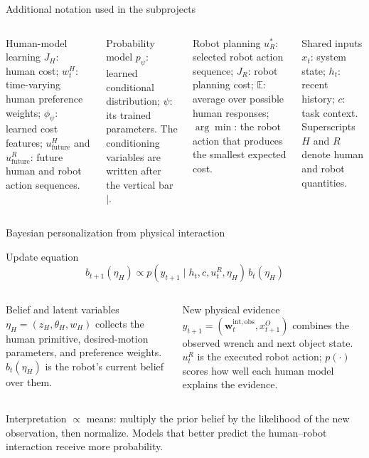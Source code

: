 \documentclass[aspectratio=169,11pt]{beamer}
\begin{document}
\begin{frame}{Additional notation used in the subprojects}
\begin{columns}[T,onlytextwidth]
\begin{block}{Human-model learning}
$J_H$: human cost; $w_t^H$: time-varying human preference weights; $\phi_\psi$: learned cost features; $u_{\mathrm{future}}^H$ and $u_{\mathrm{future}}^R$: future human and robot action sequences.
\end{block}
\begin{block}{Probability model}
$p_\psi$: learned conditional distribution; $\psi$: its trained parameters. The conditioning variables are written after the vertical bar $\mid$.
\end{block}
\begin{block}{Robot planning}
$u_R^*$: selected robot action sequence; $J_R$: robot planning cost; $\mathbb E$: average over possible human responses; $\arg\min$: the robot action that produces the smallest expected cost.
\end{block}
\begin{block}{Shared inputs}
$x_t$: system state; $h_t$: recent history; $c$: task context. Superscripts $H$ and $R$ denote human and robot quantities.
\end{block}
\end{columns}
\end{frame}

\begin{frame}{Bayesian personalization from physical interaction}
\begin{block}{Update equation}
\[
b_{t+1}(\eta_H)\propto
p(y_{t+1}\mid h_t,c,u_t^R,\eta_H)\,b_t(\eta_H)
\]
\end{block}
\begin{columns}[T,onlytextwidth]
\begin{block}{Belief and latent variables}
$\eta_H=(z_H,\theta_H,w_H)$ collects the human primitive, desired-motion parameters, and preference weights. $b_t(\eta_H)$ is the robot's current belief over them.
\end{block}
\begin{block}{New physical evidence}
$y_{t+1}=(\mathbf w_t^{\mathrm{int,obs}},x_{t+1}^O)$ combines the observed wrench and next object state. $u_t^R$ is the executed robot action; $p(\cdot)$ scores how well each human model explains the evidence.
\end{block}
\end{columns}
\vspace{0.15cm}
\begin{alertblock}{Interpretation}
$\propto$ means: multiply the prior belief by the likelihood of the new observation, then normalize. Models that better predict the human--robot interaction receive more probability.
\end{alertblock}
\end{frame}
\end{document}
